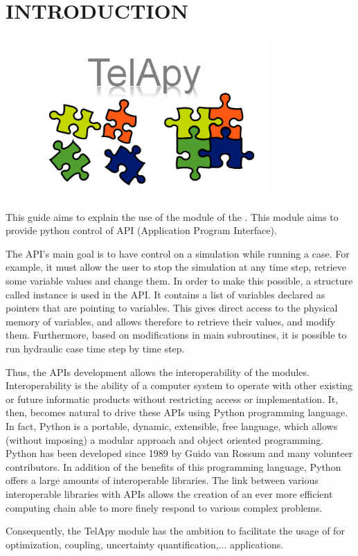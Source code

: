 \chapter{INTRODUCTION}
\label{ch:intro}

\begin{figure}[H]%
\begin{center}
%
  \includegraphics[width=0.8\textwidth]{./Figures/TelApy.png}
%
\end{center}
\label{fig:telApy}
\end{figure}

This guide aims to explain the use of the \TelApy module
of the \telemacsystem. This module aims to provide python control of \tel API
(Application Program Interface).

The API’s main goal is to have control on a simulation while running a case.
For example, it must allow the user to stop the simulation at any time step,
retrieve some variable values and change them. In order to make this possible,
a \fortran structure called instance is used in the API. It contains a
list of variables declared as pointers that are pointing to variables.
This gives direct access to the physical memory of variables, and allows
therefore to retrieve their values, and modify them. Furthermore, based on modifications
in \tel main subroutines, it is possible to run hydraulic case time step by time step.

Thus, the APIs development allows the interoperability of the \telemacsystem
modules. Interoperability is the ability of a computer system to operate with
other existing or future informatic products without restricting access or
implementation.
It, then, becomes natural to drive these APIs using Python programming
language. In fact, Python is a portable, dynamic, extensible, free language,
which allows (without imposing) a modular approach and object oriented
programming. Python has been developed since 1989 by Guido van Rossum and many
volunteer contributors. In addition of the benefits of this programming
language, Python offers a large amounts of interoperable libraries. The link
between various interoperable libraries with \telemacsystem APIs allows the
creation of an ever more efficient computing chain able to more finely respond
to various complex problems.

Consequently, the TelApy module has the ambition to facilitate the usage of
\telemacsystem for optimization, coupling, uncertainty quantification,... applications.

